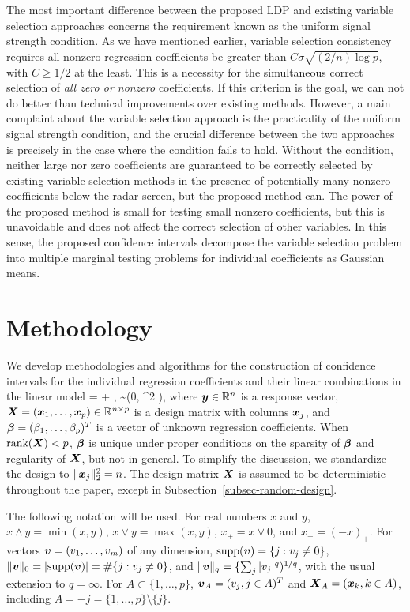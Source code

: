 \documentclass[11pt]{amsart}
\def\R{{\mathbb{R}}}
\def\supp{\hbox{supp}}
\begin{document}
The most important difference between the proposed LDP and existing 
variable selection approaches concerns the requirement known as the uniform signal strength condition. 
As we have mentioned earlier, variable selection consistency requires all nonzero regression 
coefficients be greater than $C\sigma\sqrt{(2/n)\log p}$, with $C\ge 1/2$ at the least. 
This is a necessity for the simultaneous correct selection of {\it all zero or nonzero} coefficients. 
If this criterion is the goal, we can not do better than technical improvements over existing methods. 
However, a main complaint about the variable selection approach is the practicality of the
uniform signal strength condition, and the crucial difference between the two approaches 
is precisely in the case where the condition fails to hold. 
Without the condition, neither large nor zero coefficients are guaranteed to be 
correctly selected by existing variable selection methods in the presence of
potentially many nonzero coefficients below the radar screen, 
but the proposed method can. 
The power of the proposed method is small for testing small nonzero coefficients, 
but this is unavoidable {and does not affect the correct selection of other variables}.
In this sense, the proposed {confidence intervals} decompose the variable 
selection problem into multiple marginal testing problems for individual coefficients as Gaussian means. 

\section{Methodology} 
We develop methodologies and algorithms for the construction of confidence intervals 
for the individual regression coefficients and their linear combinations in the linear model 
\by = \bX\bbeta + \bep,\; \bep \sim {}(0, \sigma^2 \bI),
\eel
where $\by\in\R^n$ is a response vector, $\bX=(\bx_1,\ldots,\bx_p)\in\R^{n\times p}$ is a 
design matrix with columns $\boldsymbol{x}_j$, and $\boldsymbol{\beta} = (\beta_1,\ldots,\beta_p)^T$ is a 
vector of unknown regression coefficients. 
When $\hbox{rank}(\boldsymbol{X}) < p$, $\boldsymbol{\beta}$ is unique under proper conditions on the sparsity of $\boldsymbol{\beta}$ and 
regularity of $\boldsymbol{X}$, but not in general. 
To simplify the discussion, we standardize the design to $\|\boldsymbol{x}_j\|_2^2=n$. 
The design matrix $\boldsymbol{X}$ is assumed to be deterministic throughout the paper, 
except in Subsection~\ref{subsec-random-design}.  

The following notation will be used. For real numbers $x$ and $y$, 
$x\wedge y = \min(x,y)$, $x\vee y =\max(x,y)$, $x_+=x\vee 0$, and $x_-=(-x)_+$. 
For vectors $\boldsymbol{v}=(v_1,\ldots,v_m)$ of any dimension, $\supp(\bv)=\{j: v_j\neq 0\}$, 
$\|\bv\|_0=|\supp(\bv)|=\#\{j: v_j\neq 0\}$, and  
$\|\boldsymbol{v}\|_q = \{\sum_j|v_j|^q)^{1/q}$, with the usual extension to $q=\infty$. 
For $A\subset\{1,\ldots,p\}$, $\boldsymbol{v}_A=(v_j,j\in A)^T$ and $\boldsymbol{X}_A=(\boldsymbol{x}_k, k\in A)$, 
including $A = -j =\{1,\ldots,p\}\setminus \{j\}$. 
\end{document}
